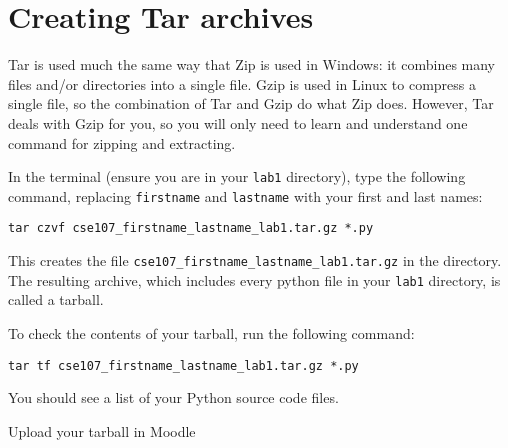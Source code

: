 \documentclass[12pt]{article}
\begin{document}
\section{Creating Tar archives}

Tar is used much the same way that Zip is used in Windows: it combines many files and/or directories into a single file. Gzip is used in Linux to compress a single file, so the combination of Tar and Gzip do what Zip does. However, Tar deals with Gzip for you, so you will only need to learn and understand one command for zipping and extracting.

In the terminal (ensure you are in your \texttt{lab1} directory), type the following command, replacing \texttt{firstname} and \texttt{lastname} with your first and last names:

\begin{lstlisting}[style=bash]
tar czvf cse107_firstname_lastname_lab1.tar.gz *.py
\end{lstlisting}

This creates the file \texttt{cse107\_firstname\_lastname\_lab1.tar.gz} in the directory. The resulting archive, which includes every python file in your \texttt{lab1} directory, is called a tarball. 

To check the contents of your tarball, run the following command:

\begin{lstlisting}[style=bash]
tar tf cse107_firstname_lastname_lab1.tar.gz *.py
\end{lstlisting}

You should see a list of your Python source code files.

Upload your tarball in Moodle
\end{document}
